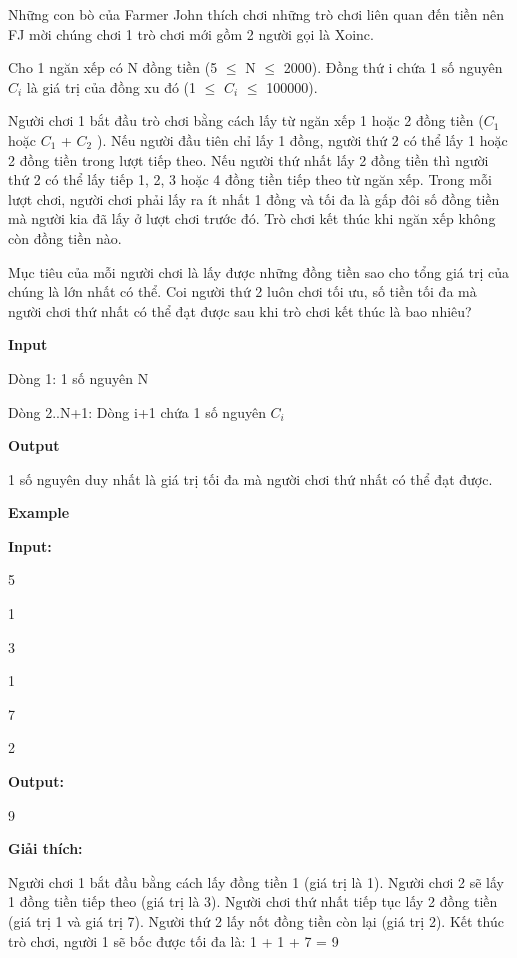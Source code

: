 















   Những con bò của Farmer John thích chơi những trò chơi liên quan đến tiền nên FJ mời chúng chơi 1 trò chơi mới gồm 2 người gọi là Xoinc.  

   Cho 1 ngăn xếp có N đồng tiền (5  $\le$  N  $\le$  2000). Đồng thứ i chứa 1 số nguyên $C_{i}$   là giá trị của đồng xu đó (1  $\le$  $C_{i}$    $\le$  100000).  

   Người chơi 1 bắt đầu trò chơi bằng cách lấy từ ngăn xếp 1 hoặc 2 đồng tiền ($C_{1}$   hoặc $C_{1}$   + $C_{2}$   ). Nếu người đầu tiên chỉ lấy 1 đồng, người thứ 2 có thể lấy 1 hoặc 2 đồng tiền trong lượt tiếp theo. Nếu người thứ nhất lấy 2 đồng tiền thì người thứ 2 có thể lấy tiếp 1, 2, 3 hoặc 4 đồng tiền tiếp theo từ ngăn xếp. Trong mỗi lượt chơi, người chơi phải lấy ra ít nhất 1 đồng và tối đa là gấp đôi số đồng tiền mà người kia đã lấy ở lượt chơi trước đó. Trò chơi kết thúc khi ngăn xếp không còn đồng tiền nào.  

   Mục tiêu của mỗi người chơi là lấy được những đồng tiền sao cho tổng giá trị của chúng là lớn nhất có thể. Coi người thứ 2 luôn chơi tối ưu, số tiền tối đa mà người chơi thứ nhất có thể đạt được sau khi trò chơi kết thúc là bao nhiêu?  



\textbf{    Input   }

   Dòng 1: 1 số nguyên N  

   Dòng 2..N+1: Dòng i+1 chứa 1 số nguyên $C_{i}$

\textbf{    Output   }

   1 số nguyên duy nhất là giá trị tối đa mà người chơi thứ nhất có thể đạt được.  

\textbf{    Example   }

\textbf{    Input:   }





   5   


   1   


   3   


   1   


   7   


   2   





\textbf{    Output:   }


   9   





\textbf{}

\textbf{     Giải thích:    }

   Người chơi 1 bắt đầu bằng cách lấy đồng tiền 1 (giá trị là 1). Người chơi 2 sẽ lấy 1 đồng tiền tiếp theo (giá trị là 3). Người chơi thứ nhất tiếp tục lấy 2 đồng tiền (giá trị 1 và giá trị 7). Người thứ 2 lấy nốt đồng tiền còn lại (giá trị 2). Kết thúc trò chơi, người 1 sẽ bốc được tối đa là: 1 + 1 + 7 = 9  


